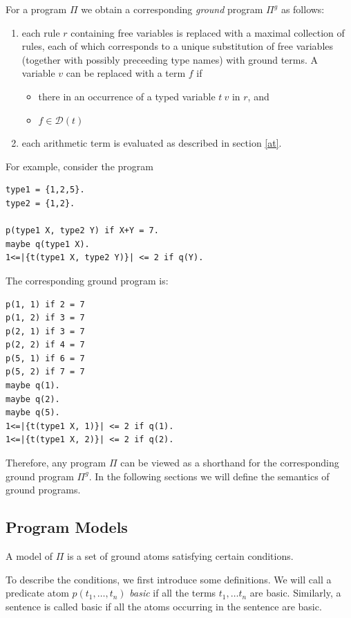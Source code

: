 \documentclass[a4paper,10pt]{article}
\begin{document}
For a program $\Pi$ we obtain a corresponding \textit{ground} program $\Pi^g$ as follows:
\begin{enumerate}
\item each rule $r$ containing free variables is replaced with a maximal collection of rules, each of which corresponds to a unique substitution 
of free variables (together with possibly preceeding type names)  with ground terms. A variable $v$ can be replaced with a term $f$ if
\begin{itemize}
\item there in an occurrence of a typed variable $t~v$ in $r$, and
\item  $f\in \mathcal{D}(t)$
\end{itemize}  
\item each arithmetic term is evaluated as described in section  \ref{at}.
\end{enumerate}

\medskip\noindent
For example, consider the program 
\begin{verbatim}
type1 = {1,2,5}.
type2 = {1,2}.

p(type1 X, type2 Y) if X+Y = 7.
maybe q(type1 X).
1<=|{t(type1 X, type2 Y)}| <= 2 if q(Y).
\end{verbatim}

\medskip\noindent
The corresponding ground program is:
\begin{verbatim}
p(1, 1) if 2 = 7
p(1, 2) if 3 = 7
p(2, 1) if 3 = 7
p(2, 2) if 4 = 7
p(5, 1) if 6 = 7
p(5, 2) if 7 = 7
maybe q(1).
maybe q(2).
maybe q(5).
1<=|{t(type1 X, 1)}| <= 2 if q(1).
1<=|{t(type1 X, 2)}| <= 2 if q(2).
\end{verbatim}

\medskip\noindent
Therefore, any program $\Pi$ can be viewed as a shorthand for the corresponding ground program $\Pi^g$.
In the following sections we will define the semantics of ground programs.


\subsection{Program Models}\label{rsat}
A model of $\Pi$ is a set of ground atoms satisfying certain conditions.

To describe the conditions,  we  first introduce some definitions.
 We will call a predicate atom $p(t_1,\ldots, t_n)$ \textit{basic} if all the terms $t_1,\ldots t_n$ are basic.
Similarly, a sentence is called basic if all the atoms occurring in the sentence are basic.
\end{document}
